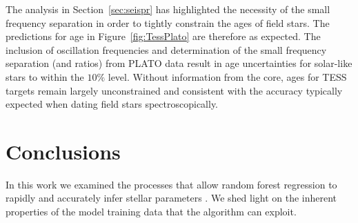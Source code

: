 The analysis in Section~\ref{sec:seispr} has highlighted the necessity of the small frequency separation  in order to 
tightly constrain the ages of field stars. The predictions for age in Figure~\ref{fig:TessPlato} are therefore as expected. 
The inclusion of oscillation frequencies and determination of the small frequency separation (and ratios) from PLATO data result in age uncertainties for solar-like stars to within the  $10\%$ level.  Without information from the core, ages for TESS targets remain largely unconstrained and consistent with the accuracy typically expected when dating field stars spectroscopically. 





\section{Conclusions}
In this work we examined the processes that allow random forest regression to rapidly and accurately infer stellar parameters \citep{2016apj...830...31b}. We shed light on the inherent properties of the model training data that the algorithm can exploit. 

